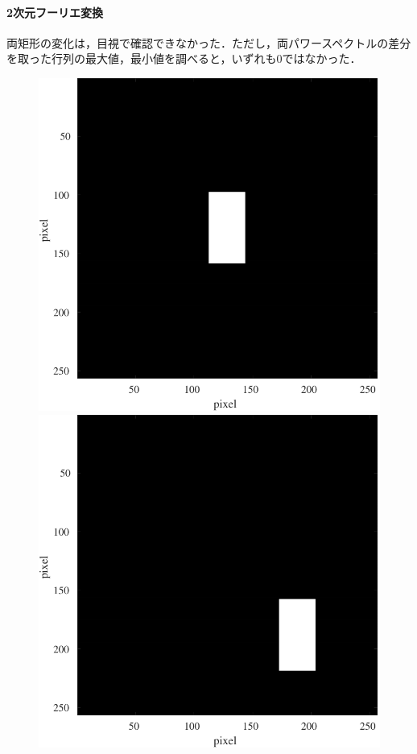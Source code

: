 \paragraph{2次元フーリエ変換}
両矩形の変化は，目視で確認できなかった．ただし，両パワースペクトルの差分を取った行列の最大値，最小値を調べると，いずれも\(0\)ではなかった．
\begin{figure}[H]
    \centering
    \begin{minipage}[b]{.2\textwidth}
        \centering
        \includegraphics[keepaspectratio,width=\textwidth]{../../Figures/08_31_rec1.pdf}
    \end{minipage}
    \begin{minipage}[b]{.2\textwidth}
        \centering
        \includegraphics[keepaspectratio,width=\textwidth]{../../Figures/08_32_rec2.pdf}

\end{minipage}
\end{figure}
